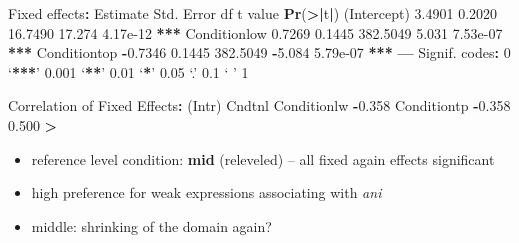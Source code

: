 \documentclass[ignorenonframetext,]{beamer}
\newenvironment{Shaded}{\begin{snugshade}}{\end{snugshade}}
\newcommand{\KeywordTok}[1]{\textcolor[rgb]{0.13,0.29,0.53}{\textbf{#1}}}
\newcommand{\DecValTok}[1]{\textcolor[rgb]{0.00,0.00,0.81}{#1}}
\newcommand{\FloatTok}[1]{\textcolor[rgb]{0.00,0.00,0.81}{#1}}
\newcommand{\StringTok}[1]{\textcolor[rgb]{0.31,0.60,0.02}{#1}}
\newcommand{\OperatorTok}[1]{\textcolor[rgb]{0.81,0.36,0.00}{\textbf{#1}}}
\newcommand{\ErrorTok}[1]{\textcolor[rgb]{0.64,0.00,0.00}{\textbf{#1}}}
\newcommand{\NormalTok}[1]{#1}
\providecommand{\tightlist}{%
  \setlength{\itemsep}{0pt}\setlength{\parskip}{0pt}}
\newcommand{\cond}[1]{\textbf{#1}}
\begin{document}
\begin{frame}[fragile]

\tiny

\begin{Shaded}
\begin{Highlighting}[]
\NormalTok{Fixed effects}\OperatorTok{:}
\StringTok{             }\NormalTok{Estimate Std. Error       df t value }\KeywordTok{Pr}\NormalTok{(}\OperatorTok{>}\ErrorTok{|}\NormalTok{t}\OperatorTok{|}\NormalTok{)    }
\NormalTok{(Intercept)    }\FloatTok{3.4901}     \FloatTok{0.2020}  \FloatTok{16.7490}  \FloatTok{17.274} \FloatTok{4.17e-12} \OperatorTok{**}\ErrorTok{*}
\NormalTok{Conditionlow   }\FloatTok{0.7269}     \FloatTok{0.1445} \FloatTok{382.5049}   \FloatTok{5.031} \FloatTok{7.53e-07} \OperatorTok{**}\ErrorTok{*}
\NormalTok{Conditiontop  }\OperatorTok{-}\FloatTok{0.7346}     \FloatTok{0.1445} \FloatTok{382.5049}  \OperatorTok{-}\FloatTok{5.084} \FloatTok{5.79e-07} \OperatorTok{**}\ErrorTok{*}
\OperatorTok{---}
\NormalTok{Signif. codes}\OperatorTok{:}\StringTok{  }\DecValTok{0}\NormalTok{ ‘}\OperatorTok{**}\ErrorTok{*}\NormalTok{’ }\FloatTok{0.001}\NormalTok{ ‘}\OperatorTok{**}\NormalTok{’ }\FloatTok{0.01}\NormalTok{ ‘}\OperatorTok{*}\NormalTok{’ }\FloatTok{0.05}\NormalTok{ ‘.’ }\FloatTok{0.1}\NormalTok{ ‘ ’ }\DecValTok{1}

\NormalTok{Correlation of Fixed Effects}\OperatorTok{:}
\StringTok{            }\NormalTok{(Intr) Cndtnl}
\NormalTok{Conditionlw }\OperatorTok{-}\FloatTok{0.358}       
\NormalTok{Conditiontp }\OperatorTok{-}\FloatTok{0.358}  \FloatTok{0.500}
\OperatorTok{>}
\end{Highlighting}
\end{Shaded}

\normalsize

\begin{itemize}
\tightlist
\item
  reference level condition: \cond{mid} (releveled) -- all fixed again
  effects significant
\item
  high preference for weak expressions associating with \emph{ani}
\item
  middle: shrinking of the domain again?
\end{itemize}

\end{frame}
\end{document}
